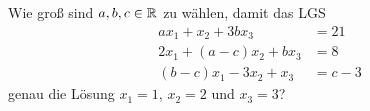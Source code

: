 \begin{ExerciseBlock}
Wie groß sind $a, b, c \in \mathbb{R}$ zu wählen, damit das LGS
	\begin{equation*}
	\begin{split}
		a x_1     + x_2       + 3 b x_3 &= 21 \\
 		2 x_1     + (a-c) x_2 + b x_3   &= 8  \\
 		(b-c) x_1 - 3x_2      + x_3     &= c-3
	\end{split}
	\end{equation*}
genau die Lösung $x_1 = 1$, $x_2 = 2$ und $x_3 = 3$? 

\end{ExerciseBlock}
